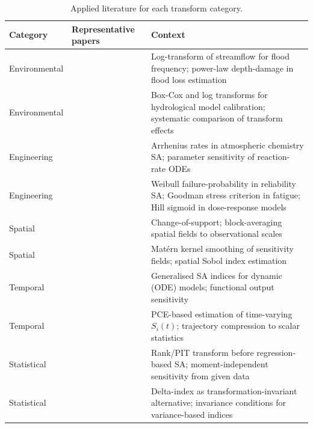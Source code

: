 \documentclass[11pt,onecolumn]{article}
\begin{document}
\begin{table}[H]
\centering
\caption{Applied literature for each transform category.}
\label{tab:transform_lit}
\small
\begin{tabular}{p{2.0cm}p{4.5cm}p{7.0cm}}
\toprule
Category & Representative papers & Context \\
\midrule
Environmental & \citet{Vogel1996,Merz2010} & Log-transform of streamflow for
flood frequency; power-law depth-damage in flood loss estimation \\
Environmental & \citet{Thirel2024,BoxCox1964} & Box-Cox and log transforms for
hydrological model calibration; systematic comparison of transform effects \\
Engineering & \citet{Arrhenius1889,Saltelli2005} & Arrhenius rates in atmospheric
chemistry SA; parameter sensitivity of reaction-rate ODEs \\
Engineering & \citet{Weibull1951,SocieMarquis2000,Hill1910} & Weibull failure-probability
in reliability SA; Goodman stress criterion in fatigue; Hill sigmoid in
dose-response models \\
Spatial & \citet{Cressie1993,GotwayYoung2002} & Change-of-support; block-averaging
spatial fields to observational scales \\
Spatial & \citet{Matern1986,MarrelSpatial2011} & Matérn kernel smoothing of
sensitivity fields; spatial Sobol index estimation \\
Temporal & \citet{Lamboni2011,Campbell2006} & Generalised SA indices for dynamic
(ODE) models; functional output sensitivity \\
Temporal & \citet{Sudret2008,Blatman2011} & PCE-based estimation of time-varying
$S_i(t)$; trajectory compression to scalar statistics \\
Statistical & \citet{Iman1979,PlischkeBorgonovo2013} & Rank/PIT transform before
regression-based SA; moment-independent sensitivity from given data \\
Statistical & \citet{Borgonovo2007,Borgonovo2014} & Delta-index as
transformation-invariant alternative; invariance conditions for variance-based indices \\
\bottomrule
\end{tabular}
\end{table}

\clearpage


\end{document}
